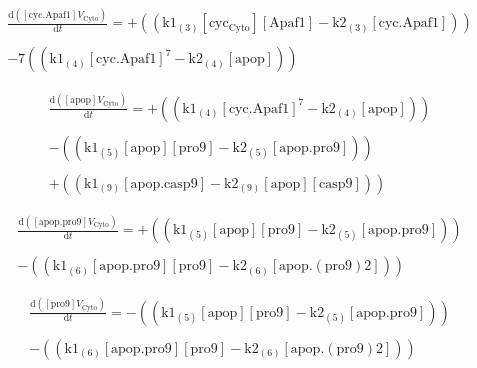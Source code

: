 \documentclass[a4paper,12pt]{article} %
\newcommand{\M}[1]{\mathrm{#1}}
\begin{document}
\begin{equation}
\begin{split}
\frac {\M{d}( {{\M{[cyc.Apaf1]}}    {V}_{\M{Cyto}} } ) }  {\M{d}{t} }  =  {  +  (( {{\M{k1}}_{\M{(3)}}    {\M{[cyc_{Cyto}]}}    {\M{[Apaf1]}}  -  {\M{k2}}_{\M{(3)}}    {\M{[cyc.Apaf1]}} } )) } \\ 
  \\ 
   {  -  {7}    (( {{\M{k1}}_{\M{(4)}}    {\M{[cyc.Apaf1]}}^7  -  {\M{k2}}_{\M{(4)}}    {\M{[apop]}} } )) } \end{split}
\end{equation}



\begin{equation}
\begin{split}
\frac {\M{d}( {{\M{[apop]}}    {V}_{\M{Cyto}} } ) }  {\M{d}{t} }  =  {  +  (( {{\M{k1}}_{\M{(4)}}    {\M{[cyc.Apaf1]}}^7  -  {\M{k2}}_{\M{(4)}}    {\M{[apop]}} } )) } \\ 
  \\ 
   {  -  (( {{\M{k1}}_{\M{(5)}}    {\M{[apop]}}    {\M{[pro9]}}  -  {\M{k2}}_{\M{(5)}}    {\M{[apop.pro9]}} } )) } \\ 
  \\ 
   {  +  (( {{\M{k1}}_{\M{(9)}}    {\M{[apop.casp9]}}  -  {\M{k2}}_{\M{(9)}}    {\M{[apop]}}    {\M{[casp9]}} } )) } \end{split}
\end{equation}


\begin{equation}
\begin{split}
\frac {\M{d}( {{\M{[apop.pro9]}}    {V}_{\M{Cyto}} } ) }  {\M{d}{t} }  =  {  +  (( {{\M{k1}}_{\M{(5)}}    {\M{[apop]}}    {\M{[pro9]}}  -  {\M{k2}}_{\M{(5)}}    {\M{[apop.pro9]}} } )) } \\ 
  \\ 
   {  -  (( {{\M{k1}}_{\M{(6)}}    {\M{[apop.pro9]}}    {\M{[pro9]}}  -  {\M{k2}}_{\M{(6)}}    {\M{[apop.(pro9)2]}} } )) } \end{split}
\end{equation}


\begin{equation}
\begin{split}
\frac {\M{d}( {{\M{[pro9]}}    {V}_{\M{Cyto}} } ) }  {\M{d}{t} }  =  {  -  (( {{\M{k1}}_{\M{(5)}}    {\M{[apop]}}    {\M{[pro9]}}  -  {\M{k2}}_{\M{(5)}}    {\M{[apop.pro9]}} } )) } \\ 
  \\ 
   {  -  (( {{\M{k1}}_{\M{(6)}}    {\M{[apop.pro9]}}    {\M{[pro9]}}  -  {\M{k2}}_{\M{(6)}}    {\M{[apop.(pro9)2]}} } )) } \end{split}
\end{equation}
\end{document}
